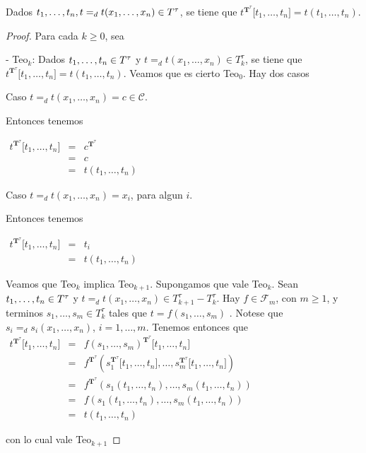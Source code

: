 
  \begin{lemma}
    \PN Dados $t_{1}, \dotsc, t_{n}, t =_{d} t(x_{1}, \dotsc, x_{n}) \in T^{\tau}$, se tiene que $t^{\mathbf{T}^{\tau}}
    \lbrack t_{1}, \dotsc, t_{n} \rbrack = t(t_{1}, \dotsc, t_{n})$.
  \end{lemma}
  \begin{proof}
    Para cada $k\geq 0$, sea

    - Teo$_{k}$: Dados $t_{1}, \dotsc, t_{n}\in T^{\tau}$ y $ t=_{d}t(x_{1}, \dotsc, x_{n})\in T_{k}^{\tau }$, se tiene que $t^{\mathbf{T} ^{\tau }}\lbrack t_{1}, \dotsc, t_{n}\rbrack=t(t_{1}, \dotsc, t_{n})$.
    Veamos que es cierto Teo$_{0}$. Hay dos casos

    Caso $t=_{d}t(x_{1}, \dotsc, x_{n})=c\in \mathcal{C}$.

    Entonces tenemos

    $\displaystyle \begin{array}{cll} t^{\mathbf{T}^{\tau }}\lbrack t_{1}, \dotsc, t_{n}\rbrack & = & c^{\mathbf{T}^{\tau }} \\ & = & c \\ & = & t(t_{1}, \dotsc, t_{n}) \end{array} $

    Caso $t=_{d}t(x_{1}, \dotsc, x_{n})=x_{i}$, para algun $i$.

    Entonces tenemos

    $\displaystyle \begin{array}{cll} t^{\mathbf{T}^{\tau }}\lbrack t_{1}, \dotsc, t_{n}\rbrack & = & t_{i} \\ & = & t(t_{1}, \dotsc, t_{n}) \end{array} $

    Veamos que Teo$_{k}$ implica Teo$_{k+1}$. Supongamos que vale Teo$_{k}$. Sean $t_{1}, \dotsc, t_{n}\in T^{\tau}$ y $t=_{d}t(x_{1}, \dotsc, x_{n})\in T_{k+1}^{\tau }-T_{k}^{\tau }$. Hay $f\in \mathcal{F}_{m}$, con $m\geq 1$, y terminos $s_{1}, \dotsc, s_{m}\in T_{k}^{\tau }$ tales que $t=f(s_{1}, \dotsc, s_{m})$ . Notese que $s_{i}=_{d}s_{i}(x_{1}, \dotsc, x_{n})$, $i=1, \dotsc, m$. Tenemos entonces que
    $\displaystyle \begin{array}{lll} t^{\mathbf{T}^{\tau }}\lbrack t_{1}, \dotsc, t_{n}\rbrack & = & f(s_{1}, \dotsc, s_{m})^{\mathbf{T} ^{\tau }}\lbrack t_{1}, \dotsc, t_{n}\rbrack \\ & = & f^{\mathbf{T}^{\tau }}(s_{1}^{\mathbf{T}^{\tau }}\lbrack t_{1}, \dotsc, t_{n}\rbrack, \dotsc, s_{m}^{\mathbf{T}^{\tau }}\lbrack t_{1}, \dotsc, t_{n}\rbrack) \\ & = & f^{\mathbf{T}^{\tau }}(s_{1}(t_{1}, \dotsc, t_{n}), \dotsc, s_{m}(t_{1}, \dotsc, t_{n})) \\ & = & f(s_{1}(t_{1}, \dotsc, t_{n}), \dotsc, s_{m}(t_{1}, \dotsc, t_{n})) \\ & = & t(t_{1}, \dotsc, t_{n}) \end{array} $

    con lo cual vale Teo$_{k+1}$
  \end{proof}

